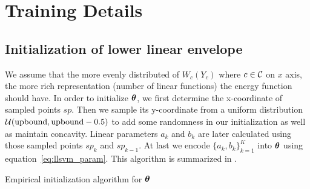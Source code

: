 
\section{Training Details}
\label{sec:train_detail}

\subsection{Initialization of lower linear envelope}
\label{sec:sup_init}

We assume that the more evenly distributed of $W_c(Y_c)$ where
$c\in\cal C$ on $x$ axis, the more rich representation (number of
linear functions) the energy function should have. In order to
initialize ${\bm{\theta}}$, we first determine the x-coordinate of
sampled points $sp$. Then we sample its y-coordinate from a
uniform distribution ${\cal U}(\text{upbound},\text{upbound}-0.5)$ to add some
randomness in our initialization as well as maintain concavity.
Linear parameters $a_k$ and $b_k$ are later calculated using
those sampled points $sp_k$ and $sp_{k-1}$. At last we encode
$\{a_k,b_k\}_{k=1}^K$ into ${\bm{\theta}}$ using
equation~\eqref{eq:llsvm_param}. This algorithm is summarized in
.

\begin{algorithm}[h]
  \begin{algorithmic}[1]
       
    \ENDIF
    \ENDFOR
     
  \end{algorithmic}
  \caption{\label{alg:init_theta} Empirical initialization
    algorithm for ${\bm{\theta}}$}
\end{algorithm}

